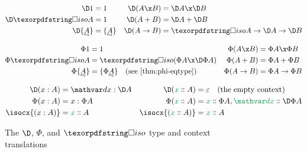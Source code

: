 \begin{figure}\centering


  \begin{align*}
    \D\tunit &= \tunit &
    \D(A \x B) &= \D A \x \D B
    \\
    \D \isof A &= \tunit &
    \D(A + B) &= \D A + \D B
    \\
    \D\tseteq A &= \tseteq A &
    \D(A \to B) &= \isof A \to \D A \to \D B
  \end{align*}\par\begin{align*}
    \Phi\tunit &= \tunit &
    \Phi(A \x B) &= \Phi A \x \Phi B
    \\
    \Phi \isof A &= \isof{(\Phi A \x \DP A)}
    &
    \Phi(A + B) &= \Phi A + \Phi B
    \\
    \Phi\tseteq A &= \tset{\Phi{\eqt A}}
    \quad\text{(see \cref{thm:phi-eqtype})}
    &
    \Phi(A \to B) &= \Phi A \to \Phi B
  \end{align*}
  \vspace{0pt} %


  \begin{align*}
    \D(\h x A) &= \h \dx {\D A} & \D(\hd x A) &= \emptycx\quad\text{(the empty context)}
    \\
    \Phi(\h x A) &= \h x {\Phi A} & \Phi(\hd x A) &= \hd x {\Phi A}, \hd \dx {\DP A}
    \\
    \isocx{(\h x A)} &= \hd x A & \isocx{(\hd x A)} &= \hd x A
  \end{align*}

  \caption{The $\D$, $\Phi$, and $\iso$ type and context translations}
  \label{fig:PhiDelta}
\end{figure}
